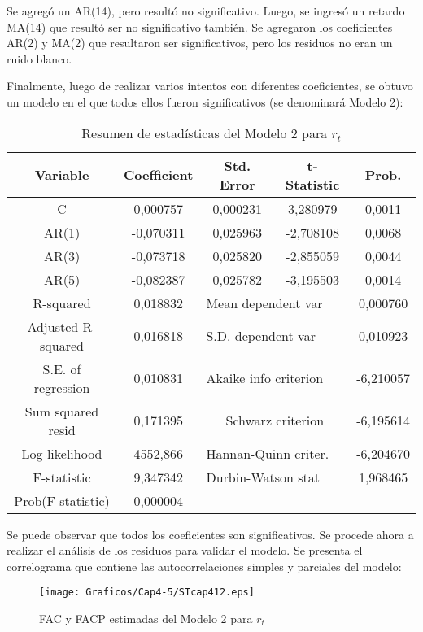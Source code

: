 Se agreg\'{o} un AR(14), pero result\'{o} no significativo. Luego, se ingres\'{o} un retardo MA(14) que result\'{o} ser no significativo tambi\'{e}n. Se agregaron los coeficientes AR(2) y MA(2) que resultaron ser significativos, pero los residuos no eran un ruido blanco.\newline

Finalmente, luego de realizar varios intentos con diferentes coeficientes, se obtuvo un modelo en el que todos ellos fueron significativos (se denominar\'{a} Modelo 2):

\begin{table}[H]
\centering
\begin{tabular}{ccccc}
Variable & Coefficient & Std. Error & t-Statistic & Prob.\\ \hline\hline
C & 0,000757 & 0,000231 & 3,280979 & 0,0011 \\
AR(1) & -0,070311 & 0,025963 & -2,708108 & 0,0068 \\
AR(3) & -0,073718 & 0,025820 & -2,855059 & 0,0044 \\
AR(5) & -0,082387 & 0,025782 & -3,195503 & 0,0014 \\ \hline\hline
R-squared & 0,018832 & \multicolumn{2}{l}{Mean dependent var} & 0,000760 \\
Adjusted R-squared & 0,016818 & \multicolumn{2}{l}{S.D. dependent var} & 0,010923 \\
S.E. of regression & 0,010831 & \multicolumn{2}{l}{Akaike info criterion} & -6,210057 \\
Sum squared resid & 0,171395 & \multicolumn{2}{|p{120pt}|}{Schwarz criterion} & -6,195614 \\
Log likelihood & 4552,866 & \multicolumn{2}{l}{Hannan-Quinn criter.} & -6,204670 \\
F-statistic & 9,347342 & \multicolumn{2}{l}{Durbin-Watson stat} & 1,968465 \\
Prob(F-statistic) & 0,000004 & & &  \\ \hline\hline
\end{tabular}
\caption{Resumen de estad\'{i}sticas del Modelo 2 para $r_{t}$}
\end{table}

Se puede observar que todos los coeficientes son significativos. Se procede ahora a realizar el an\'{a}lisis de los residuos para validar el modelo. Se presenta el correlograma que contiene las autocorrelaciones simples y parciales del modelo:

\begin{figure}[H]
\centering
\texttt{[image: Graficos/Cap4-5/STcap412.eps]}
\caption{FAC y FACP estimadas del Modelo 2 para $r_{t}$}
\end{figure}

